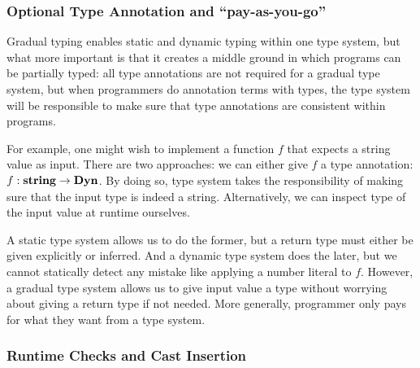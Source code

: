 




\subsubsection{Optional Type Annotation and ``pay-as-you-go''}

Gradual typing enables static and dynamic typing within one type system,
but what more important is that it creates a middle ground in which programs
can be partially typed: all type annotations are not required for a gradual type system,
but when programmers do annotation terms with types,
the type system will be responsible to make sure that type annotations are consistent
within programs.

For example, one might wish to implement a function $f$ that expects a string value
as input. There are two approaches: we can either give $f$ a type annotation:
$f : \textbf{string} \rightarrow \textbf{Dyn}$. By doing so, type system takes the responsibility
of making sure that the input type is indeed a string. Alternatively,
we can inspect type of the input value at runtime ourselves.

A static type system allows us to do the former, but a return type must either
be given explicitly or inferred. And a dynamic type system does the later, but
we cannot statically detect any mistake like applying a number literal to $f$.
However, a gradual type system allows us to give input value a type
without worrying about giving a return type if not needed.
More generally, programmer only pays for what they want from a type system.


\subsubsection{Runtime Checks and Cast Insertion}

